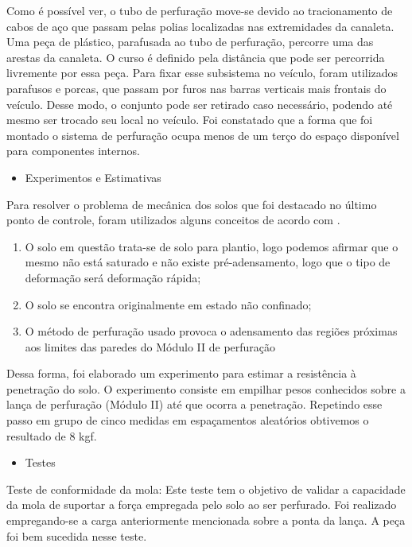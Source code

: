 	Como é possível ver, o tubo de perfuração move-se devido ao tracionamento de cabos de aço que passam pelas polias localizadas nas extremidades da canaleta. Uma peça de plástico, parafusada ao tubo de perfuração, percorre uma das arestas da canaleta. O curso é definido pela distância que pode ser percorrida livremente por essa peça. 
	Para fixar esse subsistema no veículo, foram utilizados parafusos e porcas, que passam por furos nas barras verticais mais frontais do veículo. Desse modo, o conjunto pode ser retirado caso necessário, podendo até mesmo ser trocado seu local no veículo. 
	Foi constatado que a forma que foi montado o sistema de perfuração ocupa menos de um terço do espaço disponível para componentes internos.
	
	\begin{itemize}
		\item Experimentos e Estimativas
	\end{itemize}
	
	Para resolver o problema de mecânica dos solos que foi destacado no último ponto de controle, foram utilizados alguns conceitos de acordo com \cite{bastos}.
	
	\begin{enumerate}
		\item O solo em questão trata-se de solo para plantio, logo podemos afirmar que o mesmo não está saturado e não existe pré-adensamento, logo que o tipo de deformação será deformação rápida;
		\item O solo se encontra originalmente em estado não confinado;
		\item O método de perfuração usado provoca o adensamento das regiões próximas aos limites das paredes do Módulo II de perfuração
	\end{enumerate}
	
	Dessa forma, foi elaborado um experimento para estimar a resistência à penetração do solo. O experimento consiste em empilhar pesos conhecidos sobre a lança de perfuração (Módulo II) até que ocorra a penetração. Repetindo esse passo em grupo de cinco medidas em espaçamentos aleatórios obtivemos o resultado de 8 kgf. 
	
	\begin{itemize}
		\item Testes
	\end{itemize}
	
	Teste de conformidade da mola:  Este teste tem o objetivo de validar a capacidade da mola de suportar a força empregada pelo solo ao ser perfurado. Foi realizado empregando-se a carga anteriormente mencionada sobre a ponta da lança. A peça foi bem sucedida nesse teste.
	
